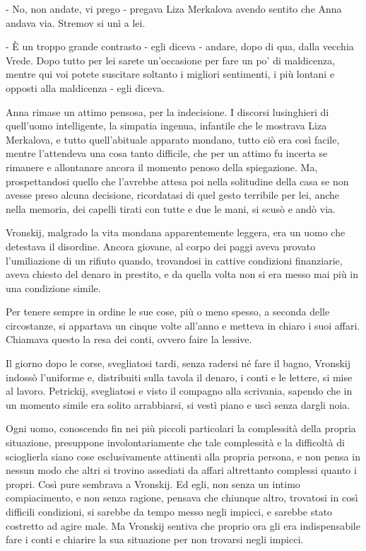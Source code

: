 - No, non andate, vi prego - pregava Liza Merkalova avendo sentito che Anna andava via. Stremov si unì a lei. 

- È un troppo grande contrasto - egli diceva - andare, dopo di qua, dalla vecchia Vrede. Dopo tutto per lei sarete un'occasione per fare un po' di maldicenza, mentre qui voi potete suscitare soltanto i migliori sentimenti, i più lontani e opposti alla maldicenza - egli diceva. 

Anna rimase un attimo pensosa, per la indecisione. I discorsi lusinghieri di quell'uomo intelligente, la simpatia ingenua, infantile che le mostrava Liza Merkalova, e tutto quell'abituale apparato mondano, tutto ciò era così facile, mentre l'attendeva una cosa tanto difficile, che per un attimo fu incerta se rimanere e allontanare ancora il momento penoso della spiegazione. Ma, prospettandosi quello che l'avrebbe attesa poi nella solitudine della casa se non avesse preso alcuna decisione, ricordatasi di quel gesto terribile per lei, anche nella memoria, dei capelli tirati con tutte e due le mani, si scusò e andò via. 

\label{xix-2} 

Vronskij, malgrado la vita mondana apparentemente leggera, era un uomo che detestava il disordine. Ancora giovane, al corpo dei paggi aveva provato l'umiliazione di un rifiuto quando, trovandosi in cattive condizioni finanziarie, aveva chiesto del denaro in prestito, e da quella volta non si era messo mai più in una condizione simile. 

Per tenere sempre in ordine le sue cose, più o meno spesso, a seconda delle circostanze, si appartava un cinque volte all'anno e metteva in chiaro i suoi affari. Chiamava questo la resa dei conti, ovvero faire la lessive. 

Il giorno dopo le corse, svegliatosi tardi, senza radersi né fare il bagno, Vronskij indossò l'uniforme e, distribuiti sulla tavola il denaro, i conti e le lettere, si mise al lavoro. Petrickij, svegliatosi e visto il compagno alla scrivania, sapendo che in un momento simile era solito arrabbiarsi, si vestì piano e uscì senza dargli noia. 

Ogni uomo, conoscendo fin nei più piccoli particolari la complessità della propria situazione, presuppone involontariamente che tale complessità e la difficoltà di scioglierla siano cose esclusivamente attinenti alla propria persona, e non pensa in nessun modo che altri si trovino assediati da affari altrettanto complessi quanto i propri. Così pure sembrava a Vronskij. Ed egli, non senza un intimo compiacimento, e non senza ragione, pensava che chiunque altro, trovatosi in così difficili condizioni, si sarebbe da tempo messo negli impicci, e sarebbe stato costretto ad agire male. Ma Vronskij sentiva che proprio ora gli era indispensabile fare i conti e chiarire la sua situazione per non trovarsi negli impicci. 

